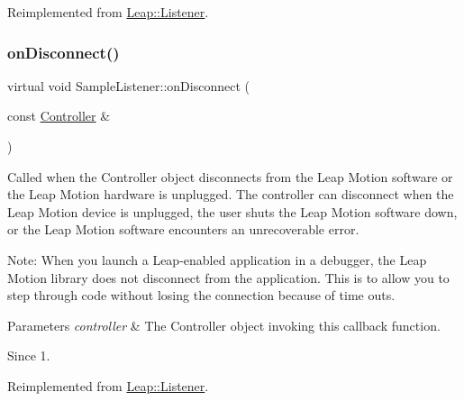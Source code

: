 Reimplemented from \hyperlink{class_leap_1_1_listener_adb6de7817e0b316b82f781a03aae5448}{Leap\+::\+Listener}.

\mbox{\label{class_sample_listener_ade7366cefc72f74663f892c2c97b7554}} 
\subsubsection{\texorpdfstring{on\+Disconnect()}{onDisconnect()}\hspace{0.1cm}{\footnotesize\ttfamily [1/2]}}
{\footnotesize\ttfamily virtual void Sample\+Listener\+::on\+Disconnect (\begin{DoxyParamCaption}\item[{const \hyperlink{class_leap_1_1_controller}{Controller} \&}]{ }\end{DoxyParamCaption})\hspace{0.3cm}{\ttfamily [virtual]}}

Called when the Controller object disconnects from the Leap Motion software or the Leap Motion hardware is unplugged. The controller can disconnect when the Leap Motion device is unplugged, the user shuts the Leap Motion software down, or the Leap Motion software encounters an unrecoverable error.


\begin{DoxyCodeInclude}
\end{DoxyCodeInclude}


Note\+: When you launch a Leap-\/enabled application in a debugger, the Leap Motion library does not disconnect from the application. This is to allow you to step through code without losing the connection because of time outs.


\begin{DoxyParams}{Parameters}
{\em controller} & The Controller object invoking this callback function. \\
\hline
\end{DoxyParams}
\begin{DoxySince}{Since}
1. 
\end{DoxySince}


Reimplemented from \hyperlink{class_leap_1_1_listener_ac031e2d95b530097e2060518a9190f5e}{Leap\+::\+Listener}.

\mbox{\label{class_sample_listener_a8df4ceac8fd1b88ce4bacbb068234315}} 
